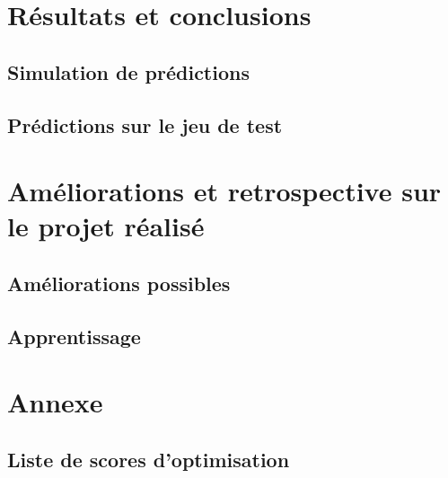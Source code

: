 \documentclass{article}
\numberwithin{equation}{section}
\begin{document}
\section{Résultats et conclusions} \label{sec:resultats}
\subsection{Simulation de prédictions} \label{subsec:simulation}


\subsection{Prédictions sur le jeu de test} \label{subsec:predictions}



\section{Améliorations et retrospective sur le projet réalisé} \label{sec:ameliorations}
\subsection{Améliorations possibles} \label{subsec:ameliorations}


\subsection{Apprentissage} \label{subsec:apprentissage}



\section{Annexe} \label{sec:annexe}
\subsection{Liste de scores d'optimisation} \label{subsec:scores}

\end{document}
